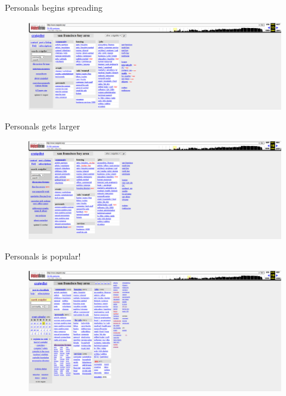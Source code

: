 \documentclass{beamer}
\begin{document}
\begin{frame}{Personals begins spreading}
\begin{figure}
    \centering
    \includegraphics[height=0.85\textheight]{./lecture_includes/melanie4}
\end{figure}

\end{frame}

\begin{frame}{Personals gets larger}
\begin{figure}
    \centering
    \includegraphics[height=0.85\textheight]{./lecture_includes/melanie5}
\end{figure}

\end{frame}

\begin{frame}{Personals is popular!}
\begin{figure}
    \centering
    \includegraphics[height=0.85\textheight]{./lecture_includes/melanie6}
\end{figure}

\end{frame}
\end{document}
